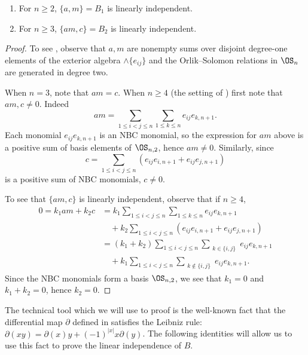 \documentclass{amsart}
\begin{document}
\begin{lemma}\label{lemma:Deg1-2LI}
    \begin{enumerate}
        \item\label{item:Deg1LI} For $n \geq 2$, $\{a,m\} = B_1$ is linearly independent.
        \item\label{item:Deg2LI} For $n \geq 3$, $\{am, c\} = B_2$ is linearly independent.
    \end{enumerate}
\end{lemma}
\begin{proof}
    To see , observe that $a,m$ are nonempty sums over disjoint degree-one elements of the exterior algebra $\wedge \{e_{ij}\}$ and the Orlik--Solomon relations in $\OS_n$ are generated in degree two.

    When $n = 3$, note that $am = c$.
    When $n \geq 4$ (the setting of ) first note that $am, c \neq 0$.
    Indeed
    \[am = \sum_{1 \leq i < j \leq n}\sum_{1 \leq k  \leq n} e_{ij}e_{k,n+1}.\]
    Each monomial $e_{ij}e_{k,n+1}$ is an NBC monomial, so the expression for $am$ above is a positive sum of basis elements of $\OS_{n,2}$, hence $am\neq 0$.
    Similarly, since 
    \[c = \sum_{1 \leq i < j \leq n} \left( e_{ij}e_{i,n+1} + e_{ij}e_{j,n+1}\right)\]
    is a positive sum of NBC monomials, $c \neq 0$.

    To see that $\{am, c\}$ is linearly independent, observe that if $n \geq 4$,
    \begin{align*}
        0 = k_1 am + k_2 c 
        &= k_1  \sum_{1 \leq i < j \leq n}\sum_{1 \leq k  \leq n} e_{ij}e_{k,n+1} \\
        &\quad + k_2 \sum_{1 \leq i < j \leq n} \left( e_{ij}e_{i,n+1} + e_{ij}e_{j,n+1}\right) \\
        &= (k_1 + k_2) \sum_{1 \leq i < j \leq n}\sum_{\substack{k \in \{i,j\}}} e_{ij}e_{k,n+1}\\
        &\quad + k_1 \sum_{1 \leq i < j \leq n}\sum_{\substack{k \not\in \{i,j\}}} e_{ij}e_{k,n+1}.
    \end{align*}
    Since the NBC monomials form a basis $\OS_{n,2}$, we see that $k_1 = 0$ and $k_1 + k_2 = 0$, hence $k_2 = 0$.
\end{proof}


The technical tool which we will use to proof  is the well-known fact that the differential map $\partial$ defined in  satisfies the Leibniz rule: $\partial(xy) = \partial(x) y + (-1)^{|x|} x \partial(y)$.
The following identities will allow us to use this fact to prove the linear independence of $B$.
\end{document}
